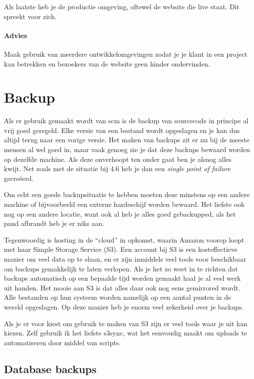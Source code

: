 Als laatste heb je de productie omgeving, oftewel de website die live staat. Dit spreekt voor zich.

\paragraph{Advies} Maak gebruik van meerdere ontwikkelomgevingen zodat je je klant in een project kan betrekken en bezoekers van de website geen hinder ondervinden.

\section{Backup}

Als er gebruik gemaakt wordt van {\sc scm} is de backup van sourcecode in principe al vrij goed geregeld. Elke versie van een bestand wordt opgeslagen en je kan dus altijd terug naar een vorige versie. Het maken van backups zit er nu bij de meeste mensen al wel goed in, maar vaak genoeg zie je dat deze backups bewaard worden op dezelfde machine. Als deze onverhoopt ten onder gaat ben je alsnog alles kwijt. Net zoals met de situatie bij 4.6 heb je dan een \emph{single point of failure} gecreëerd.

Om echt een goede backupsituatie te hebben moeten deze minstens op een andere machine of bijvoorbeeld een externe hardeschijf worden bewaard. Het liefste ook nog op een andere locatie, want ook al heb je alles goed gebackupped, als het pand afbrandt heb je er niks aan.

Tegenwoordig is hosting in de ``cloud'' in opkomst, waarin Amazon voorop loopt met haar Simple Storage Service (S3). Een account bij S3 is een kosteffectieve manier om veel data op te slaan, en er zijn inmiddels veel tools voor beschikbaar om backups gemakkelijk te laten verlopen. Als je het zo weet in te richten dat backups automatisch op een bepaalde tijd worden gemaakt haal je al veel werk uit handen. Het mooie aan S3 is dat alles daar ook nog eens gemirrored wordt. Alle bestanden op hun systeem worden namelijk op een aantal punten in de wereld opgeslagen. Op deze manier heb je enorm veel zekerheid over je backups.

Als je er voor kiest om gebruik te maken van S3 zijn er veel tools waar je uit kan kiezen.\cite{amazontools} Zelf gebruik ik het liefste s3sync\cite{s3sync}, wat het eenvoudig maakt om uploads te automatiseren door middel van scripts.

\subsection{Database backups}

